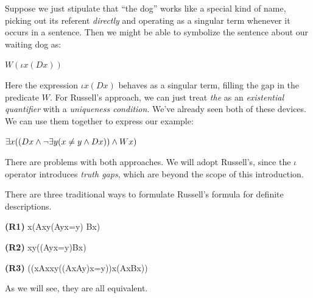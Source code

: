 Suppose we just stipulate that ``the dog'' works like a special kind of name,
picking out its referent \emph{directly} and operating as a singular term
whenever it occurs in a sentence. Then we might be able to symbolize the
sentence about our waiting dog as:

\begin{argument}
\item[ ] $W(\iota x(Dx))$
\end{argument}

Here the expression $\iota x(Dx)$ behaves as a singular term, filling the
gap in the predicate $W$. For Russell's approach, we can just treat \emph{the}
as an \emph{existential quantifier} with a \emph{uniqueness condition}. We've
already seen both of these devices. We can use them together to express our
example:

\begin{argument}
\item[ ] $\exists x((Dx\wedge\neg\exists y(x\neq y\wedge Dx))\wedge Wx)$
\end{argument}

There are problems with both approaches. We will adopt Russell's, since the
$\iota$ operator introduces \emph{truth gaps}, which are beyond the scope of
this introduction.

There are three traditional ways to formulate Russell's formula for definite
descriptions.

\begin{argument}
\item[\textbf{(R1)}] \eexists x(Ax\eand\eforall y(Ay\eif x=y) \eand Bx)
\item[\textbf{(R2)}] \eexists x\eforall y((Ay\eiff x=y)\eand Bx)
\item[\textbf{(R3)}] ((\eexists xAx\eand\eforall x\eforall y((Ax\eand Ay)\eif x=y))\eand\eforall x(Ax\eif Bx))
\end{argument}

As we will see, they are all equivalent.

